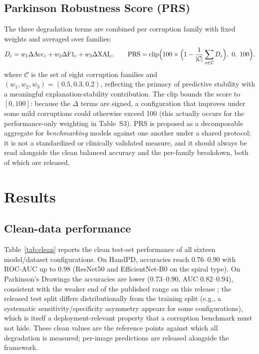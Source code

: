 \documentclass[11pt,a4paper]{article}
\begin{document}
\subsection{Parkinson Robustness Score (PRS)}
The three degradation terms are combined per corruption family with fixed
weights and averaged over families:
\begin{equation}
D_c = w_1 \Delta\mathrm{Acc}_c + w_2 \Delta\mathrm{F1}_c + w_3 \Delta\mathrm{XAI}_c,
\qquad
\mathrm{PRS} = \operatorname{clip}\Bigl(100 \times \Bigl(1 - \frac{1}{|\mathcal{C}|}\sum_{c \in \mathcal{C}} D_c\Bigr),\ 0,\ 100\Bigr),
\label{eq:prs}
\end{equation}
where $\mathcal{C}$ is the set of eight corruption families and
$(w_1, w_2, w_3) = (0.5, 0.3, 0.2)$, reflecting the primacy of predictive
stability with a meaningful explanation-stability contribution. The clip
bounds the score to $[0,100]$: because the $\Delta$ terms are signed, a
configuration that improves under some mild corruptions could otherwise
exceed 100 (this actually occurs for the performance-only weighting in
Table~S3). PRS is proposed as a decomposable aggregate for \emph{benchmarking}
models against one another under a shared protocol; it is not a standardized
or clinically validated measure, and it should always be read alongside the
clean balanced accuracy and the per-family breakdown, both of which are
released.

\section{Results}
\label{sec:results}

\subsection{Clean-data performance}
Table~\ref{tab:clean} reports the clean test-set performance of all sixteen
model/dataset configurations. On HandPD, accuracies reach 0.76--0.90 with
ROC-AUC up to 0.98 (ResNet50 and EfficientNet-B0 on the spiral type). On
Parkinson's Drawings the accuracies are lower (0.73--0.90, AUC 0.82--0.94),
consistent with the weaker end of the published range on this release
\cite{huang2024}; the released test split differs distributionally from the
training split (e.g., a systematic sensitivity/specificity asymmetry appears
for some configurations), which is itself a deployment-relevant property that
a corruption benchmark must not hide. These clean values are the reference
points against which all degradation is measured; per-image predictions are
released alongside the framework.
\end{document}
